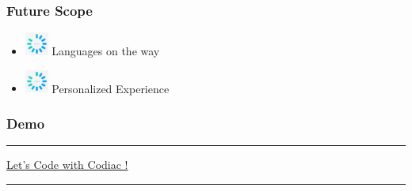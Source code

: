 \documentclass[14pt]{beamer}
\begin{document}
\begin{frame}
    \frametitle{Future Scope}
	\noindent                                                                                                       {\color{pink} \rule{\linewidth}{0.7mm}} 
         \begin{itemize}
 \item [] \includegraphics[width=0.3in, height=0.3in]{./Codiac/logos/loading.jpg} Languages on the way\\
     \pause
 \item [] \includegraphics[width=0.3in, height=0.3in]{./Codiac/logos/loading.jpg} Personalized Experience \\
 \end{itemize}
\noindent{	
	   \color{pink} \rule{\linewidth}{0.7mm} }   	
\end{frame}	


\begin{frame}
	\frametitle{Demo}
    {\color{dr} \rule{\linewidth}{0.7mm}}
    \linebreak
    \linebreak
    \centerline
    {\huge \color{dr}
    \href{https://codiac-codenow.herokuapp.com}{Let's Code with Codiac !}}
    \linebreak

    {\color{dr} \rule{\linewidth}{0.7mm}}
\end{frame}
\end{document}
